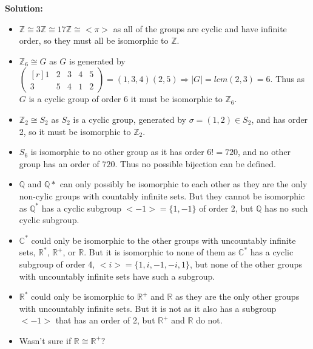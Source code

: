 \documentclass[12pt, letterpaper]{article}
\newenvironment{solution}
    [0]
    {\noindent \textbf{Solution:}} 
    {\vspace{3mm}}
\begin{document}
\begin{solution}
    \begin{itemize}
        \item $\mathbb{Z} \cong 3\mathbb{Z} \cong 17\mathbb{Z} \cong {<}\pi{>}$ as all of the groups are 
        cyclic and have infinite order, so they must all be isomorphic to $\mathbb{Z}$.
        
        \item $\mathbb{Z}_6 \cong G$ as $G$ is generated by $\begin{pmatrix*}[r] 1 & 2 & 3 & 4 & 5\\
        3 & 5 & 4 & 1 & 2 \end{pmatrix*} = (1, 3, 4)(2, 5) \Rightarrow |G| = lcm(2, 3) = 6$. Thus
        as $G$ is a cyclic group of order 6 it must be isomorphic to $\mathbb{Z}_6$.
        
        \item $\mathbb{Z}_2 \cong S_2$ as $S_2$ is a cyclic group, generated by $\sigma = (1, 2) \in S_2$, 
        and has order 2, so it must be isomorphic to $\mathbb{Z}_2$.

        \item $S_6$ is isomorphic to no other group as it has order $6! = 720$, and no other
        group has an order of $720$. Thus no possible bijection can be defined.

        \item $\mathbb{Q}$ and $\mathbb{Q}*$ can only possibly be isomorphic to each other 
        as they are the only non-cylic groups with countably infinite sets. But they cannot be 
        isomorphic as $\mathbb{Q}^*$ has a cyclic subgroup ${<}{-}1{>} = \{1, -1\}$ of order 2,
        but $\mathbb{Q}$ has no such cyclic subgroup.

        \item $\mathbb{C}^*$ could only be isomorphic to the other groups with uncountably infinite
        sets, $\mathbb{R}^*$, $\mathbb{R}^+$, or $\mathbb{R}$. But it is isomorphic to none of them as
        $\mathbb{C}^*$ has a cyclic subgroup of order 4, ${<}i{>} = \{1, i, -1, -i, 1\}$, but none of 
        the other groups with uncountably infinite sets have such a subgroup.

        \item $\mathbb{R}^*$ could only be isomorphic to $\mathbb{R}^+$ and $\mathbb{R}$ as they
        are the only other groups with uncountably infinite sets. But it is not as it also has a 
        subgroup ${<}{-}1{>}$ that has an order of 2, but $\mathbb{R}^+$ and $\mathbb{R}$ do not.
        
        \item Wasn't sure if $\mathbb{R} \cong \mathbb{R}^+?$
    \end{itemize}
\end{solution}
\end{document}
